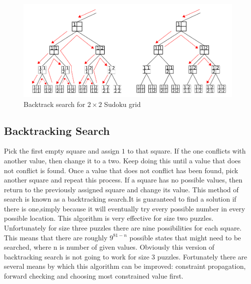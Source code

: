 \documentclass[fleqn,10pt]{SelfArx}
\begin{document}
\begin{figure}[ht]\centering 
\includegraphics[scale=0.5]{BackTrack.PNG}
\caption{Backtrack search for $2 \times 2$ Sudoku grid}
\label{fig:view}
\end{figure}


\subsection{Backtracking Search}
Pick the first empty square
and assign $1$ to that square. If the one conflicts with another value, then change it to a two. Keep
doing this until a value that does not conflict is found. Once a value that does not conflict has been
found, pick another square and repeat this process. If a square has no possible values, then return to
the previously assigned square and change its value. This method of search is known as a
backtracking search.It is guaranteed to find a solution if there is one,simply because it will eventually try every possible number in every possible location. This
algorithm is very effective for size two puzzles. Unfortunately for size three puzzles there are nine
possibilities for each square. This means that there are roughly $9^{81-n}$ possible states that might
need to be searched, where n is number of given values. Obviously this version of backtracking
search is not going to work for size 3 puzzles. Fortunately there are several means by which this
algorithm can be improved: constraint propagation, forward checking and choosing most
constrained value first.
\end{document}
